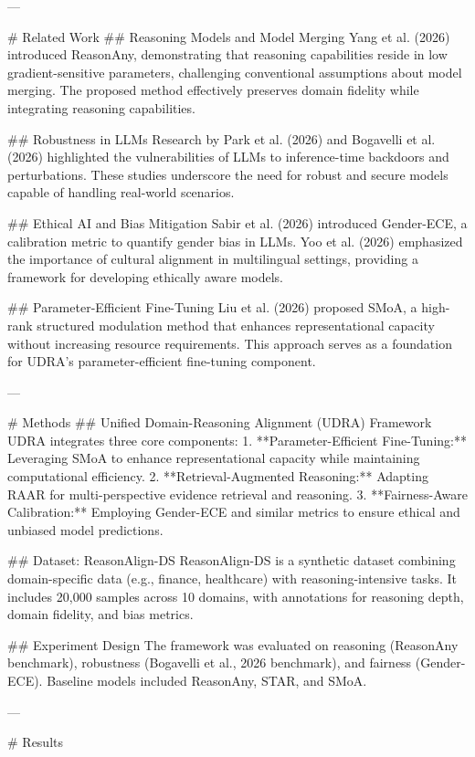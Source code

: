 ---

# Related Work  
## Reasoning Models and Model Merging  
Yang et al. (2026) introduced ReasonAny, demonstrating that reasoning capabilities reside in low gradient-sensitive parameters, challenging conventional assumptions about model merging. The proposed method effectively preserves domain fidelity while integrating reasoning capabilities.  

## Robustness in LLMs  
Research by Park et al. (2026) and Bogavelli et al. (2026) highlighted the vulnerabilities of LLMs to inference-time backdoors and perturbations. These studies underscore the need for robust and secure models capable of handling real-world scenarios.  

## Ethical AI and Bias Mitigation  
Sabir et al. (2026) introduced Gender-ECE, a calibration metric to quantify gender bias in LLMs. Yoo et al. (2026) emphasized the importance of cultural alignment in multilingual settings, providing a framework for developing ethically aware models.  

## Parameter-Efficient Fine-Tuning  
Liu et al. (2026) proposed SMoA, a high-rank structured modulation method that enhances representational capacity without increasing resource requirements. This approach serves as a foundation for UDRA's parameter-efficient fine-tuning component.  

---

# Methods  
## Unified Domain-Reasoning Alignment (UDRA) Framework  
UDRA integrates three core components:  
1. **Parameter-Efficient Fine-Tuning:** Leveraging SMoA to enhance representational capacity while maintaining computational efficiency.  
2. **Retrieval-Augmented Reasoning:** Adapting RAAR for multi-perspective evidence retrieval and reasoning.  
3. **Fairness-Aware Calibration:** Employing Gender-ECE and similar metrics to ensure ethical and unbiased model predictions.  

## Dataset: ReasonAlign-DS  
ReasonAlign-DS is a synthetic dataset combining domain-specific data (e.g., finance, healthcare) with reasoning-intensive tasks. It includes 20,000 samples across 10 domains, with annotations for reasoning depth, domain fidelity, and bias metrics.  

## Experiment Design  
The framework was evaluated on reasoning (ReasonAny benchmark), robustness (Bogavelli et al., 2026 benchmark), and fairness (Gender-ECE). Baseline models included ReasonAny, STAR, and SMoA.  

---

# Results  

